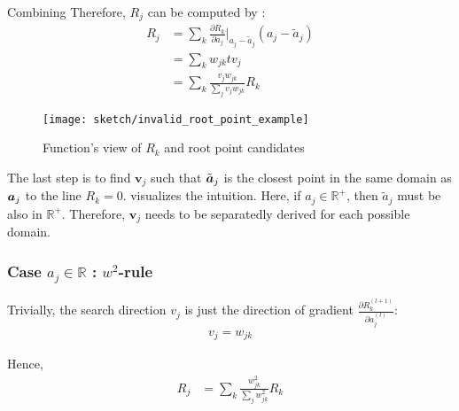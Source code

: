 Combining
Therefore, $R_j$ can be computed by :
\begin{align}
R_j &= \sum_k	\frac{\partial  R_k }{ \partial a_j } \bigg|_{ a_j - \tilde{a}_j }  ( a_j - \tilde{a}_j ) \\
&=	\sum_k w_{jk} tv_j \\
&=	\sum_k \frac{ v_j w_{jk}   }{\sum_{j} v_j w_{jk}}  R_k
\end{align}

\begin{figure}[!hbt]
\centering
\texttt{[image: sketch/invalid\_root\_point\_example]}
\caption{Function's view of $R_k$  and root point candidates}
\label{fig:root_point_illus}
\end{figure}



The last step is to find $\boldsymbol{v}_j$ such that $\tilde{\patvector{a}}_j$ is the closest point in the same domain as $\patvector{a}_j$ to the line $R_k=0$. \addfigure{\ref{fig:root_point_illus}} visualizes the intuition. Here, if $a_j \in \mathbb{R}^+$, then $\tilde{a}_j$ must be also in $\mathbb{R}^+$. Therefore, $\boldsymbol{v}_j$ needs to be separatedly derived for each possible domain.


\subsubsection{Case $a_j \in \mathbb{R}$ : $w^2$-rule}

Trivially, the search direction $v_j$ is just the direction of gradient $\frac{\partial  R_k^{(l+1)} }{ \partial a_j^{(l)} }$:
\begin{align*}
	v_j = w_{jk}
\end{align*}

Hence, 
\begin{align*}
	R_j &=	\sum_k \frac{ w_{jk}^2  }{\sum_{j} w_{jk}^2}  R_k
\end{align*}

